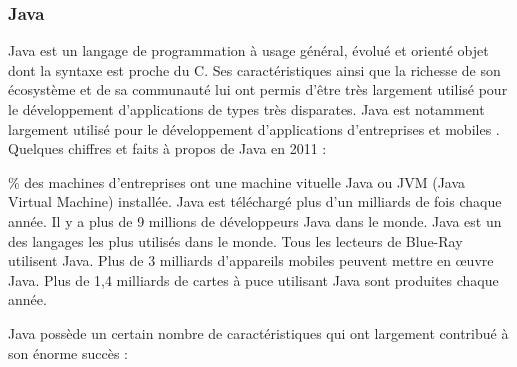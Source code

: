 \subsubsection{Java}
Java est un langage de programmation à usage général, évolué et orienté objet dont la syntaxe est proche du C. Ses caractéristiques ainsi que la richesse de son écosystème et de sa communauté lui ont permis d'être très largement utilisé pour le développement d'applications de types très disparates. Java est notamment largement utilisé pour le développement d'applications d'entreprises et mobiles \cite{java}.\\
Quelques chiffres et faits à propos de Java en 2011 :
\begin{itemize}
	\% des machines d'entreprises ont une machine vituelle Java ou JVM (Java Virtual Machine) installée. 
	\itemcheck Java est téléchargé plus d'un milliards de fois chaque année.
	\itemcheck Il y a plus de 9 millions de développeurs Java dans le monde.
	\itemcheck Java est un des langages les plus utilisés dans le monde.
	\itemcheck Tous les lecteurs de Blue-Ray utilisent Java.
	\itemcheck Plus de 3 milliards d'appareils mobiles peuvent mettre en œuvre Java.
	\itemcheck Plus de 1,4 milliards de cartes à puce utilisant Java sont produites chaque année.
\end{itemize}
Java possède un certain nombre de caractéristiques qui ont largement contribué à son énorme succès :
